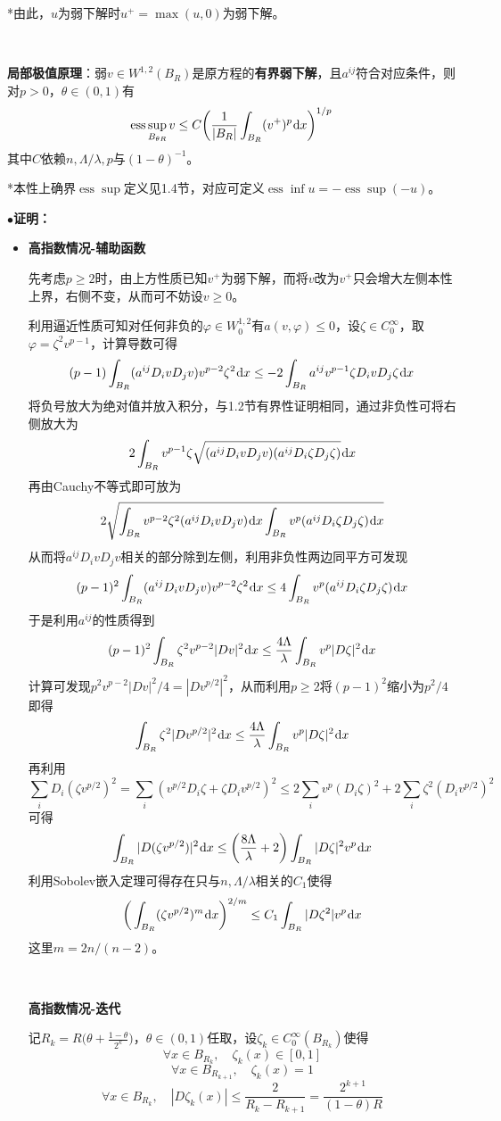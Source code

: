 \documentclass[a4paper,UTF8,fontset=windows,AutoFakeBold]{ctexart}
\newcommand*{\dr}{\hspace{0.07em}\mathrm{d}}
\DeclareMathOperator*{\ess}{ess}
\newcommand{\proo}[1]{{\kaishu $\bullet$\textbf{证明：}
\begin{itemize}
    \item[] #1
\end{itemize}
}}
\begin{document}
*由此，$u$为弱下解时$u^+=\max(u,0)$为弱下解。

\

\textbf{局部极值原理}：弱$v\in W^{1,2}(B_R)$是原方程的\textbf{有界弱下解}，且$a^{ij}$符合对应条件，则对$p>0$，$\theta\in(0,1)$有
$$\ess\sup_{B_{\theta R}}v\le C\bigg(\frac{1}{|B_R|}\int_{B_R}(v^+)^p\dr x\bigg)^{1/p}$$
其中$C$依赖$n,\Lambda/\lambda,p$与$(1-\theta)^{-1}$。

*本性上确界$\ess\sup$定义见1.4节，对应可定义$\ess\inf u=-\ess\sup(-u)$。

\proo{
    \textbf{高指数情况-辅助函数}

    先考虑$p\ge2$时，由上方性质已知$v^+$为弱下解，而将$v$改为$v^+$只会增大左侧本性上界，右侧不变，从而可不妨设$v\ge0$。

    利用逼近性质可知对任何非负的$\varphi\in W_0^{1,2}$有$a(v,\varphi)\le0$，设$\zeta\in C_0^\infty$，取$\varphi=\zeta^2v^{p-1}$，计算导数可得
    $$(p-1)\int_{B_R}(a^{ij}D_ivD_jv)v^{p-2}\zeta^2\dr x\le-2\int_{B_R}a^{ij}v^{p-1}\zeta D_ivD_j\zeta\dr x$$
    将负号放大为绝对值并放入积分，与1.2节有界性证明相同，通过非负性可将右侧放大为
    $$2\int_{B_R}v^{p-1}\zeta\sqrt{(a^{ij}D_ivD_jv)(a^{ij}D_i\zeta D_j\zeta)}\dr x$$
    再由Cauchy不等式即可放为
    $$2\sqrt{\int_{B_R}v^{p-2}\zeta^2(a^{ij}D_ivD_jv)\dr x\int_{B_R}v^p(a^{ij}D_i\zeta D_j\zeta)\dr x}$$
    从而将$a^{ij}D_ivD_jv$相关的部分除到左侧，利用非负性两边同平方可发现
    $$(p-1)^2\int_{B_R}(a^{ij}D_ivD_jv)v^{p-2}\zeta^2\dr x\le4\int_{B_R}v^p(a^{ij}D_i\zeta D_j\zeta)\dr x$$
    于是利用$a^{ij}$的性质得到
    $$(p-1)^2\int_{B_R}\zeta^2v^{p-2}|Dv|^2\dr x\le\frac{4\Lambda}{\lambda}\int_{B_R}v^p|D\zeta|^2\dr x$$
    计算可发现$p^2v^{p-2}|Dv|^2/4=|Dv^{p/2}|^2$，从而利用$p\ge2$将$(p-1)^2$缩小为$p^2/4$即得
    $$\int_{B_R}\zeta^2|Dv^{p/2}|^2\dr x\le\frac{4\Lambda}{\lambda}\int_{B_R}v^p|D\zeta|^2\dr x$$
    再利用
    $$\sum_iD_i(\zeta v^{p/2})^2=\sum_i(v^{p/2}D_i\zeta+\zeta D_iv^{p/2})^2\le2\sum_iv^p(D_i\zeta)^2+2\sum_i\zeta^2(D_iv^{p/2})^2$$
    可得
    $$\int_{B_R}|D(\zeta v^{p/2})|^2\dr x\le\bigg(\frac{8\Lambda}{\lambda}+2\bigg)\int_{B_R}|D\zeta|^2v^p\dr x$$
    利用Sobolev嵌入定理可得存在只与$n,\Lambda/\lambda$相关的$C_1$使得
    $$\bigg(\int_{B_R}(\zeta v^{p/2})^m\dr x\bigg)^{2/m}\le C_1\int_{B_R}|D\zeta^2|v^p\dr x$$
    这里$m=2n/(n-2)$。

    \

    \textbf{高指数情况-迭代}

    记$R_k=R\big(\theta+\frac{1-\theta}{2^k}\big)$，$\theta\in(0,1)$任取，设$\zeta_k\in C_0^\infty(B_{R_k})$使得
    $$\forall x\in B_{R_k},\quad\zeta_k(x)\in[0,1]$$
    $$\forall x\in B_{R_{k+1}},\quad\zeta_k(x)=1$$
    $$\forall x\in B_{R_k},\quad|D\zeta_k(x)|\le\frac{2}{R_k-R_{k+1}}=\frac{2^{k+1}}{(1-\theta)R}$$

}
\end{document}
